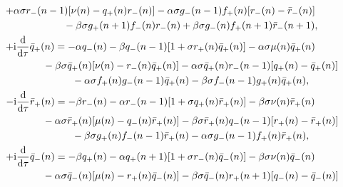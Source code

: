 \documentclass[10pt,a4paper]{amsart}
\numberwithin{equation}{section}
\begin{document}
\begin{gather}
	 +\alpha\sigma r_{-}(n-1)[\nu(n)-q_{+}(n)r_{-}(n)] - \alpha\sigma g_{-}(n-1)f_{+}(n)[r_{-}(n)-\bar{r}_{-}(n)]\nonumber\\
 \hspace{0.25mm}\hphantom{-\mathrm{i}\frac{\mathrm{d}}{\mathrm{d}\tau}r_{-}(n) =}{}
	 -\beta\sigma g_{+}(n+1)f_{-}(n)r_{-}(n) +\beta\sigma g_{-}(n)f_{+}(n+1)\bar{r}_{-}(n+1), \label{eq-6.4}
\\
	 +\mathrm{i}\frac{\mathrm{d}}{\mathrm{d}\tau}\bar{q}_{+}(n) = -\alpha q_{-}(n) - \beta q_{-}(n-1)[1+\sigma r_{+}(n)\bar{q}_{+}(n)] - \alpha\sigma\mu(n)\bar{q}_{+}(n)\nonumber\\
 \hspace{0.25mm}\hphantom{+\mathrm{i}\frac{\mathrm{d}}{\mathrm{d}\tau}\bar{q}_{+}(n) =}{}
	 -\beta\sigma \bar{q}_{+}(n)[\nu(n)-r_{-}(n)\bar{q}_{+}(n)] - \alpha\sigma \bar{q}_{+}(n)r_{-}(n-1)[q_{+}(n)-\bar{q}_{+}(n)]\nonumber\\
 \hspace{0.25mm}\hphantom{+\mathrm{i}\frac{\mathrm{d}}{\mathrm{d}\tau}\bar{q}_{+}(n) =}{}
	 -\alpha\sigma f_{+}(n)g_{-}(n-1)\bar{q}_{+}(n) -\beta\sigma f_{-}(n-1)g_{+}(n)\bar{q}_{+}(n), \label{eq-6.5}
\\
	 -\mathrm{i}\frac{\mathrm{d}}{\mathrm{d}\tau}\bar{r}_{+}(n) = -\beta r_{-}(n) - \alpha r_{-}(n-1)[1+\sigma q_{+}(n)\bar{r}_{+}(n)] - \beta\sigma\nu(n)\bar{r}_{+}(n)\nonumber\\
 \hspace{0.25mm}\hphantom{-\mathrm{i}\frac{\mathrm{d}}{\mathrm{d}\tau}\bar{r}_{+}(n) =}{}
	 -\alpha\sigma \bar{r}_{+}(n)[\mu(n)-q_{-}(n)\bar{r}_{+}(n)] - \beta\sigma \bar{r}_{+}(n)q_{-}(n-1)[r_{+}(n)-\bar{r}_{+}(n)]\nonumber\\
 \hspace{0.25mm}\hphantom{-\mathrm{i}\frac{\mathrm{d}}{\mathrm{d}\tau}\bar{r}_{+}(n) =}{}
	 -\beta\sigma g_{+}(n)f_{-}(n-1)\bar{r}_{+}(n) -\alpha\sigma g_{-}(n-1)f_{+}(n)\bar{r}_{+}(n), \label{eq-6.6}
\\
	 +\mathrm{i}\frac{\mathrm{d}}{\mathrm{d}\tau}\bar{q}_{-}(n) = -\beta q_{+}(n) - \alpha q_{+}(n+1)[1+\sigma r_{-}(n)\bar{q}_{-}(n)] - \beta\sigma\nu(n)\bar{q}_{-}(n)\nonumber\\
 \hspace{0.25mm}\hphantom{+\mathrm{i}\frac{\mathrm{d}}{\mathrm{d}\tau}\bar{q}_{-}(n) =}{}
	 -\alpha\sigma \bar{q}_{-}(n)[\mu(n)-r_{+}(n)\bar{q}_{-}(n)] - \beta\sigma \bar{q}_{-}(n)r_{+}(n+1)[q_{-}(n)-\bar{q}_{-}(n)]\nonumber\\
 \hspace{0.25mm}\hphantom{+\mathrm{i}\frac{\mathrm{d}}{\mathrm{d}\tau}\bar{q}_{-}(n) =}{}

\end{gather}
\end{document}
